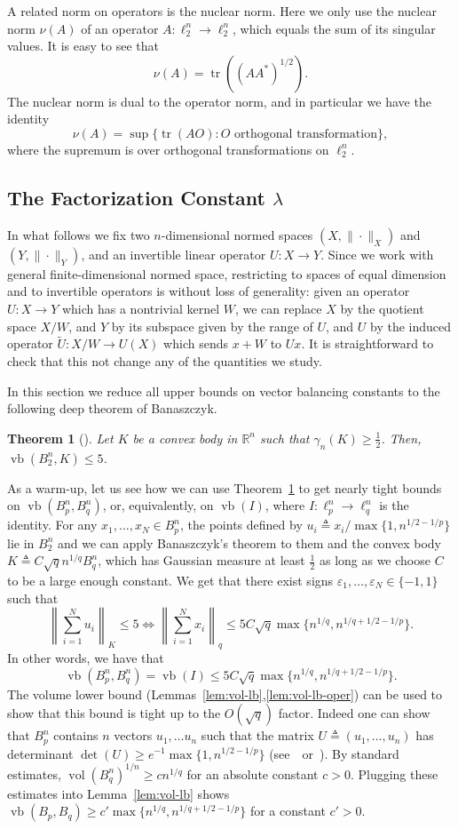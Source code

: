 \documentclass[11pt]{article}
\newtheorem{theorem}{Theorem}
\newcommand{\R}{{\mathbb{R}}}
\newcommand\eps{\varepsilon}
\newcommand{\eqdef}{\triangleq}
\DeclareMathOperator{\vb}{vb}
\DeclareMathOperator{\vol}{vol}
\DeclareMathOperator{\tr}{tr}
\begin{document}
A related norm on operators is the nuclear norm. Here we only use the
nuclear norm $\nu(A)$ of an operator $A:\ell_2^n \to \ell_2^n$, which
equals the sum of its singular values. It is easy to see that
\[
\nu(A) = \tr((AA^*)^{1/2}).
\]
The nuclear norm is dual to the operator norm, and in particular we
have the identity
\[
\nu(A) = \sup\{\tr(AO): O \text{ orthogonal transformation}\},
\]
where the supremum is over orthogonal transformations on $\ell_2^n$. 



\subsection{The Factorization Constant $\lambda$}

In what follows we fix two $n$-dimensional normed spaces $(X,
\|\cdot\|_X)$ and $(Y,\|\cdot\|_Y)$, and an invertible linear operator
$U:X \to Y$. Since we work with general finite-dimensional normed
space, restricting to spaces of equal dimension and to invertible
operators is without loss of generality: given an operator $U:X \to Y$
which has a nontrivial kernel $W$, we can replace $X$ by the
quotient space $X/W$, and $Y$ by its subspace given by the range of
$U$, and $U$ by the induced operator $\tilde{U}:X/W \to U(X)$ which
sends $x+W$ to $Ux$. It is straightforward to check that this not
change any of the quantities we study.

In this section we reduce all upper bounds on vector balancing
constants to the following deep theorem of Banaszczyk.
\begin{theorem}[\cite{bana}]\label{thm:bana}
  Let $K$ be a convex body in $\R^n$ such that $\gamma_n(K) \ge
  \frac12$. Then, $\vb(B_2^n, K) \le 5$.
\end{theorem}

As a warm-up, let us see how we can use Theorem~\ref{thm:bana} to get
nearly tight bounds on $\vb(B^n_p, B^n_q)$, or, equivalently, on
$\vb(I)$, where $I:\ell_p^n \to \ell_q^n$ is the identity. For any
$x_1, \ldots, x_N \in B_p^n$, the points defined by $u_i \eqdef
{x_i}/{\max\{1, n^{1/2 -1/p}\}}$ lie in $B_2^n$ and we can apply
Banaszczyk's theorem to them and the convex body $K \eqdef C \sqrt{q}
n^{1/q} B_q^n$, which has Gaussian
measure at least $\frac12$ as long as we choose $C$ to be a large
enough constant. We get that there exist signs $\eps_1, \ldots, \eps_N
\in \{-1, 1\}$ such that 
\[
\left\|\sum_{i = 1}^N{u_i}\right\|_K \le 5
\iff
\left\|\sum_{i = 1}^N{x_i}\right\|_q \le
 5C\sqrt{q}\max\{n^{1/q}, n^{1/q + 1/2 -1/p}\}. 
\]
In other words, we have that 
\[
\vb(B_p^n, B_q^n) = \vb(I) \le
5C\sqrt{q}\max\{n^{1/q}, n^{1/q + 1/2 -1/p}\}.
\]
The volume lower bound (Lemmas~\ref{lem:vol-lb},\ref{lem:vol-lb-oper})
can be used to show that this bound is tight up to the $O(\sqrt{q})$
factor. Indeed one can show that $B_p^n$ contains $n$ vectors $u_1,
\ldots u_n$ such that the matrix $U \eqdef  (u_1, \ldots, u_n)$ has
determinant $\det(U) \ge e^{-1}  \max\{1, n^{1/2 -1/p}\}$
(see~\cite{Ball89}~or~\cite{N15}). By standard estimates,
$\vol(B_q^n)^{1/n} \ge c n^{1/q}$ for an absolute constant
$c >0$. Plugging these estimates into Lemma~\ref{lem:vol-lb} shows
$\vb(B_p, B_q) \ge c' \max\{n^{1/q}, n^{1/q + 1/2 -1/p}\}$ for a
constant $c' > 0$. 
\end{document}
